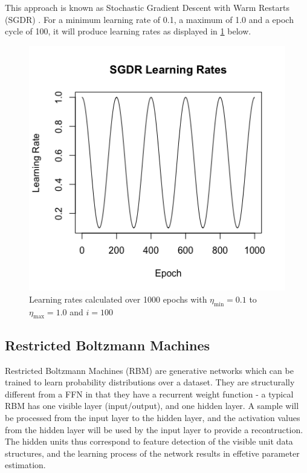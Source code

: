 \documentclass[a4paper,latin]{paper}
\begin{document}
This approach is known as Stochastic Gradient Descent with Warm Restarts (SGDR) \cite{Loshchilov}. For a minimum learning rate of 0.1, a maximum of 1.0 and a epoch cycle of 100, it will produce learning rates as displayed in \ref{figure-SGDRLearningRates} below.

\begin{figure}[H]
	\centering \includegraphics[scale=0.5]{images/implementation/SGDRLearningRates.png}
	\caption{Learning rates calculated over 1000 epochs with $\eta_{\min} = 0.1$ to $\eta_{\max} = 1.0$ and $i=100$}
	\label{figure-SGDRLearningRates}
\end{figure}		

\subsection{Restricted Boltzmann Machines}\label{imp_rbm}

Restricted Boltzmann Machines (RBM) are generative networks which can be trained to learn probability distributions over a dataset. They are structurally different from a FFN in that they have a recurrent weight function - a typical RBM has one visible layer (input/output), and one hidden layer. A sample will be processed from the input layer to the hidden layer, and the activation values from the hidden layer will be used by the input layer to provide a recontruction. The hidden units thus correspond to feature detection of the visible unit data structures, and the learning process of the network results in effetive parameter estimation. 
\end{document}
